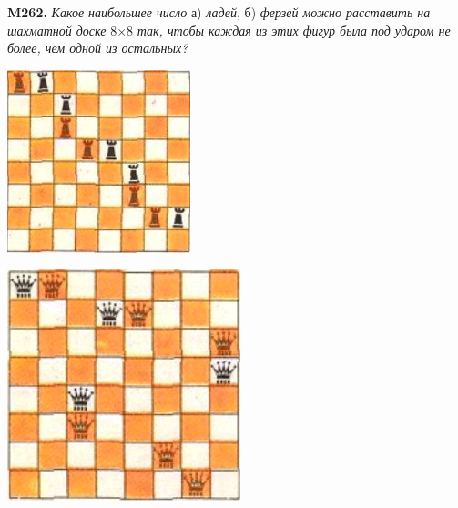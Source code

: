 \thispagestyle{empty} %
\begin{minipage}{.3\textwidth}
    \vspace{-2cm}
    \textbf{M262.}
    \textit{Какое наибольшее число} а) \textit{ладей}, б) \textit{ферзей можно расставить на шахматной доске }8$\times$8\textit{ так, чтобы каждая из этих фигур была под ударом не более, чем одной из остальных?}
    \begin{flushleft}
        \vspace{0.5cm}
        \includegraphics[width=\textwidth]{images/1.png}
        \label{fig:8}
        
        \vspace{0.5cm}
        \includegraphics[width=\textwidth]{images/2.png}
        \label{fig:9}
    \end{flushleft}


\end{minipage}
